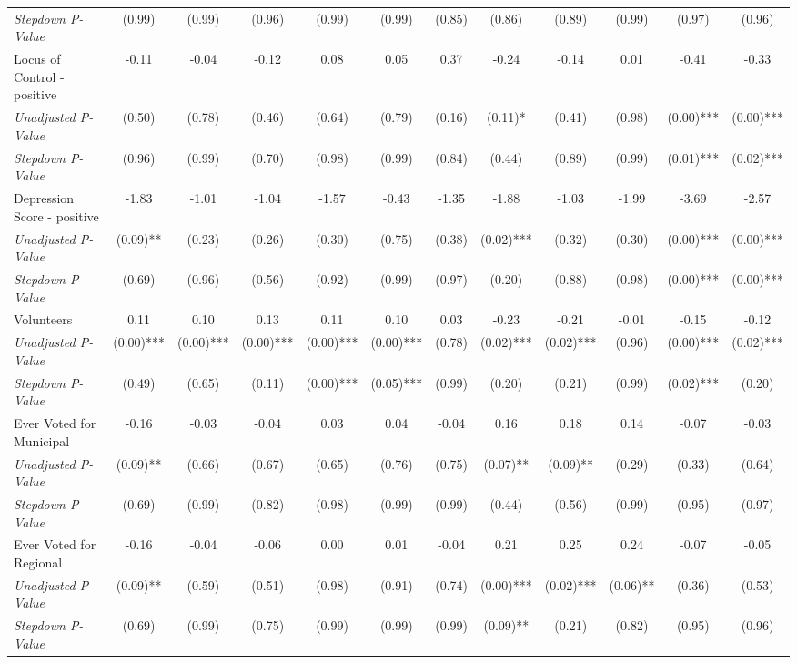 \begin{tabular}{l c c c c c c c c c c c}
\quad \textit{Stepdown P-Value} & (0.99) & (0.99) & (0.96) & (0.99) & (0.99) & (0.85) & (0.86) & (0.89) & (0.99) & (0.97) & (0.96) \\
Locus of Control - positive & -0.11 & -0.04 & -0.12 & 0.08 & 0.05 & 0.37 & -0.24 & -0.14 & 0.01 & -0.41 & -0.33 \\
\quad \textit{Unadjusted P-Value} & (0.50) & (0.78) & (0.46) & (0.64) & (0.79) & (0.16) & (0.11)* & (0.41) & (0.98) & (0.00)*** & (0.00)*** \\
\quad \textit{Stepdown P-Value} & (0.96) & (0.99) & (0.70) & (0.98) & (0.99) & (0.84) & (0.44) & (0.89) & (0.99) & (0.01)*** & (0.02)*** \\
Depression Score - positive & -1.83 & -1.01 & -1.04 & -1.57 & -0.43 & -1.35 & -1.88 & -1.03 & -1.99 & -3.69 & -2.57 \\
\quad \textit{Unadjusted P-Value} & (0.09)** & (0.23) & (0.26) & (0.30) & (0.75) & (0.38) & (0.02)*** & (0.32) & (0.30) & (0.00)*** & (0.00)*** \\
\quad \textit{Stepdown P-Value} & (0.69) & (0.96) & (0.56) & (0.92) & (0.99) & (0.97) & (0.20) & (0.88) & (0.98) & (0.00)*** & (0.00)*** \\
Volunteers & 0.11 & 0.10 & 0.13 & 0.11 & 0.10 & 0.03 & -0.23 & -0.21 & -0.01 & -0.15 & -0.12 \\
\quad \textit{Unadjusted P-Value} & (0.00)*** & (0.00)*** & (0.00)*** & (0.00)*** & (0.00)*** & (0.78) & (0.02)*** & (0.02)*** & (0.96) & (0.00)*** & (0.02)*** \\
\quad \textit{Stepdown P-Value} & (0.49) & (0.65) & (0.11) & (0.00)*** & (0.05)*** & (0.99) & (0.20) & (0.21) & (0.99) & (0.02)*** & (0.20) \\
Ever Voted for Municipal & -0.16 & -0.03 & -0.04 & 0.03 & 0.04 & -0.04 & 0.16 & 0.18 & 0.14 & -0.07 & -0.03 \\
\quad \textit{Unadjusted P-Value} & (0.09)** & (0.66) & (0.67) & (0.65) & (0.76) & (0.75) & (0.07)** & (0.09)** & (0.29) & (0.33) & (0.64) \\
\quad \textit{Stepdown P-Value} & (0.69) & (0.99) & (0.82) & (0.98) & (0.99) & (0.99) & (0.44) & (0.56) & (0.99) & (0.95) & (0.97) \\
Ever Voted for Regional & -0.16 & -0.04 & -0.06 & 0.00 & 0.01 & -0.04 & 0.21 & 0.25 & 0.24 & -0.07 & -0.05 \\
\quad \textit{Unadjusted P-Value} & (0.09)** & (0.59) & (0.51) & (0.98) & (0.91) & (0.74) & (0.00)*** & (0.02)*** & (0.06)** & (0.36) & (0.53) \\
\quad \textit{Stepdown P-Value} & (0.69) & (0.99) & (0.75) & (0.99) & (0.99) & (0.99) & (0.09)** & (0.21) & (0.82) & (0.95) & (0.96) \\

\end{tabular}
